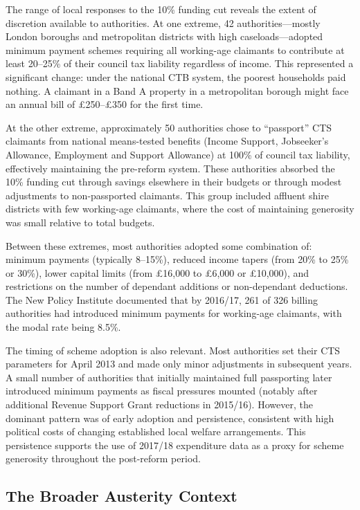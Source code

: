 \documentclass[12pt]{article}
\begin{document}
The range of local responses to the 10\% funding cut reveals the extent of discretion available to authorities. At one extreme, 42 authorities---mostly London boroughs and metropolitan districts with high caseloads---adopted minimum payment schemes requiring all working-age claimants to contribute at least 20--25\% of their council tax liability regardless of income. This represented a significant change: under the national CTB system, the poorest households paid nothing. A claimant in a Band A property in a metropolitan borough might face an annual bill of \pounds250--\pounds350 for the first time.

At the other extreme, approximately 50 authorities chose to ``passport'' CTS claimants from national means-tested benefits (Income Support, Jobseeker's Allowance, Employment and Support Allowance) at 100\% of council tax liability, effectively maintaining the pre-reform system. These authorities absorbed the 10\% funding cut through savings elsewhere in their budgets or through modest adjustments to non-passported claimants. This group included affluent shire districts with few working-age claimants, where the cost of maintaining generosity was small relative to total budgets.

Between these extremes, most authorities adopted some combination of: minimum payments (typically 8--15\%), reduced income tapers (from 20\% to 25\% or 30\%), lower capital limits (from \pounds16,000 to \pounds6,000 or \pounds10,000), and restrictions on the number of dependant additions or non-dependant deductions. The New Policy Institute documented that by 2016/17, 261 of 326 billing authorities had introduced minimum payments for working-age claimants, with the modal rate being 8.5\%.

The timing of scheme adoption is also relevant. Most authorities set their CTS parameters for April 2013 and made only minor adjustments in subsequent years. A small number of authorities that initially maintained full passporting later introduced minimum payments as fiscal pressures mounted (notably after additional Revenue Support Grant reductions in 2015/16). However, the dominant pattern was of early adoption and persistence, consistent with high political costs of changing established local welfare arrangements. This persistence supports the use of 2017/18 expenditure data as a proxy for scheme generosity throughout the post-reform period.

\subsection{The Broader Austerity Context}
\end{document}
